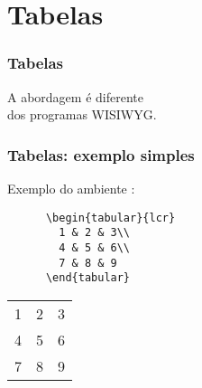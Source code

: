 \section{Tabelas}

\begin{frame}
  \frametitle{Tabelas}
  \LARGE
  A abordagem é diferente\\
  dos programas WISIWYG.
\end{frame}

\begin{frame}[fragile]
  \frametitle{Tabelas: exemplo simples}
  \LARGE
  Exemplo do ambiente :
  \vspace{1em}

  \begin{minipage}{.65\textwidth}
    \begin{verbatim}
      \begin{tabular}{lcr}
        1 & 2 & 3\\
        4 & 5 & 6\\
        7 & 8 & 9
      \end{tabular}
    \end{verbatim}
  \end{minipage}
  \hspace{.05\textwidth}
  \begin{minipage}{.25\textwidth}
    \begin{tabular}{lcr}
      1 & 2 & 3\\
      4 & 5 & 6\\
      7 & 8 & 9
    \end{tabular}
  \end{minipage}
\end{frame}

